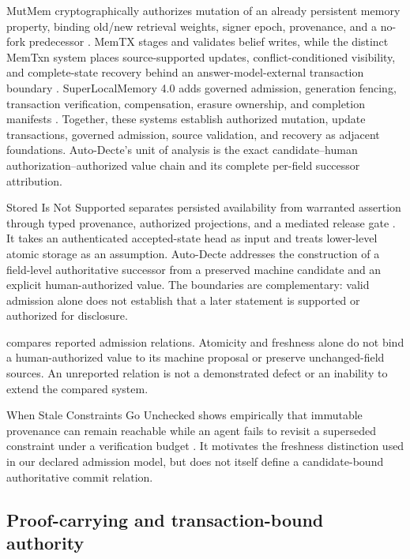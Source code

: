 MutMem cryptographically authorizes mutation of an already persistent memory property, binding old/new retrieval weights, signer epoch, provenance, and a no-fork predecessor \citep{saidi2026mutmem}. MemTX stages and validates belief writes, while the distinct MemTxn system places source-supported updates, conflict-conditioned visibility, and complete-state recovery behind an answer-model-external transaction boundary \citep{li2026memtx,cui2026memtxn}. SuperLocalMemory 4.0 adds governed admission, generation fencing, transaction verification, compensation, erasure ownership, and completion manifests \citep{bhardwaj2026superlocalmemory}. Together, these systems establish authorized mutation, update transactions, governed admission, source validation, and recovery as adjacent foundations. Auto-Decte's unit of analysis is the exact candidate--human authorization--authorized value chain and its complete per-field successor attribution.

Stored Is Not Supported separates persisted availability from warranted assertion through typed provenance, authorized projections, and a mediated release gate \citep{he2026stored}. It takes an authenticated accepted-state head as input and treats lower-level atomic storage as an assumption. Auto-Decte addresses the construction of a field-level authoritative successor from a preserved machine candidate and an explicit human-authorized value. The boundaries are complementary: valid admission alone does not establish that a later statement is supported or authorized for disclosure.

 compares reported admission relations. Atomicity and freshness alone do not bind a human-authorized value to its machine proposal or preserve unchanged-field sources. An unreported relation is not a demonstrated defect or an inability to extend the compared system.

When Stale Constraints Go Unchecked shows empirically that immutable provenance can remain reachable while an agent fails to revisit a superseded constraint under a verification budget \citep{nakayashiki2026staleconstraints}. It motivates the freshness distinction used in our declared admission model, but does not itself define a candidate-bound authoritative commit relation.



\subsection{Proof-carrying and transaction-bound authority}

